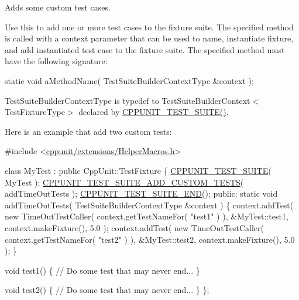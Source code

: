 Adds some custom test cases. 

Use this to add one or more test cases to the fixture suite. The specified method is called with a context parameter that can be used to name, instantiate fixture, and add instantiated test case to the fixture suite. The specified method must have the following signature\-: 
\begin{DoxyCode}
\textcolor{keyword}{static} \textcolor{keywordtype}{void} aMethodName( TestSuiteBuilderContextType &context );
\end{DoxyCode}


{\ttfamily Test\-Suite\-Builder\-Context\-Type} is typedef to Test\-Suite\-Builder\-Context$<$\-Test\-Fixture\-Type$>$ declared by \hyperlink{group___writing_test_fixture_gabe1e12200f40d6f25d60c1783c99da81}{C\-P\-P\-U\-N\-I\-T\-\_\-\-T\-E\-S\-T\-\_\-\-S\-U\-I\-T\-E()}.

Here is an example that add two custom tests\-:


\begin{DoxyCode}
\textcolor{preprocessor}{#include <\hyperlink{_helper_macros_8h}{cppunit/extensions/HelperMacros.h}>}

\textcolor{keyword}{class }MyTest : \textcolor{keyword}{public} CppUnit::TestFixture \{
  \hyperlink{group___writing_test_fixture_gabe1e12200f40d6f25d60c1783c99da81}{CPPUNIT\_TEST\_SUITE}( MyTest );
  \hyperlink{group___writing_test_fixture_ga516fec19cd7a7acb6fbf194bd98c4c09}{CPPUNIT\_TEST\_SUITE\_ADD\_CUSTOM\_TESTS}( addTimeOutTests );
  \hyperlink{group___writing_test_fixture_ga601b2e1d525f3947b216e28c625abcb1}{CPPUNIT\_TEST\_SUITE\_END}();
\textcolor{keyword}{public}:
  \textcolor{keyword}{static} \textcolor{keywordtype}{void} addTimeOutTests( TestSuiteBuilderContextType &context )
  \{
    context.addTest( \textcolor{keyword}{new} TimeOutTestCaller( context.getTestNameFor( \textcolor{stringliteral}{"test1"} ) ),
                                            &MyTest::test1,
                                            context.makeFixture(),
                                            5.0 );
    context.addTest( \textcolor{keyword}{new} TimeOutTestCaller( context.getTestNameFor( \textcolor{stringliteral}{"test2"} ) ),
                                            &MyTest::test2,
                                            context.makeFixture(),
                                            5.0 );
  \}

  \textcolor{keywordtype}{void} test1()
  \{
    \textcolor{comment}{// Do some test that may never end...}
  \}

  \textcolor{keywordtype}{void} test2()
  \{
    \textcolor{comment}{// Do some test that may never end...}
  \}
\};
\end{DoxyCode}
 
